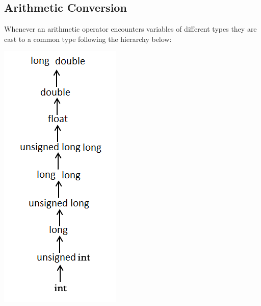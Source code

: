 \documentclass[10pt,a4paper]{scrartcl}
\begin{document}
\begin{multicols*}{2}
\subsection{Arithmetic Conversion}

Whenever an arithmetic operator encounters variables of different types they are cast to a common type following the hierarchy below:

\includegraphics[angle=90, width=\linewidth]{UsualArithmeticConversion}


\end{multicols*}
\end{document}

